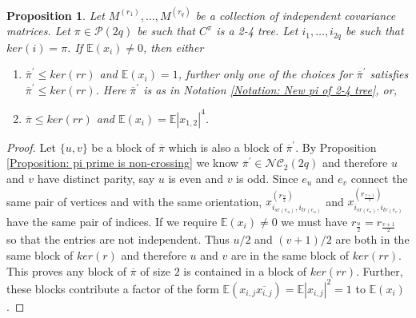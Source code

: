 \documentclass{article}
\newtheorem{proposition}[theorem]{Proposition}
\theoremstyle{definition}
\newcommand{\E}{\mathbb{E}}
\newcommand{\cP}{\mathcal{P}}
\newcommand{\NC}{\mathcal{NC}}
\begin{document}
{\begin{proposition}\label{Proposition: contribution of 2-4 tree}
Let $M^{(r_1)},\dots, M^{(r_q)}$ be a collection of independent covariance matrices. Let $\pi\in \cP(2q)$ be such that $C^\pi$ is a 2-4 tree. Let $i_1,\dots,i_{2q}$ be such that $ker(i)=\pi$. If $\E(x_i)\neq 0$, then either
\begin{enumerate}
    \item $\overline{\pi}^\prime \leq ker(rr)$ and $\E(x_i)=1$, further only one of the choices for $\overline{\pi}^\prime$ satisfies $\overline{\pi}^\prime \leq ker(rr)$. Here $\overline{\pi}^\prime$ is as in Notation \ref{Notation: New pi of 2-4 tree}, or,
    \item $\overline{\pi}\leq ker(rr)$ and $\E(x_i)=\E|x_{1,2}|^4$. 
\end{enumerate}
\end{proposition}
\begin{proof}
Let $\{u,v\}$ be a block of $\overline{\pi}$ which is also a block of $\overline{\pi}^\prime$. By Proposition \ref{Proposition: pi prime is non-crossing} we know $\overline{\pi}^\prime\in \NC_2(2q)$ and therefore $u$ and $v$ have distinct parity, say $u$ is even and $v$ is odd. Since $e_u$ and $e_v$ connect the same pair of vertices and with the same orientation, $x_{i_{sr(e_u)},i_{tr(e_u)}}^{(r_{\frac{u}{2}})}$ and $x_{i_{sr(e_v)},i_{tr(e_v)}}^{(r_{\frac{v+1}{2}})}$ have the same pair of indices. If we require $\E(x_i)\neq 0$ we must have $r_{\frac{u}{2}}=r_{\frac{v+1}{2}}$ so that the entries are not independent. Thus $u/2$ and $(v+1)/2$ are both in the same block of $ker(r)$ and therefore $u$ and $v$ are in the same block of $ker(rr)$. This proves any block of $\overline{\pi}$ of size $2$ is contained in a block of $ker(rr)$. Further, these blocks contribute a factor of the form $\E(x_{i,j}\overline{x_{i,j}})=\E|x_{i,j}|^2=1$ to $\E(x_i)$.


\end{proof}}
\end{document}
